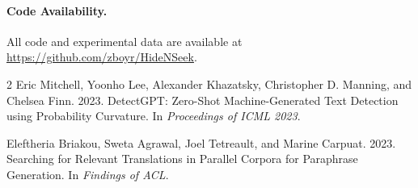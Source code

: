 \documentclass[sigconf,nonacm]{acmart}
\begin{document}
\paragraph{Code Availability.} All code and experimental data are available at \url{https://github.com/zboyr/HideNSeek}.


\begin{thebibliography}{2}
Eric Mitchell, Yoonho Lee, Alexander Khazatsky, Christopher D. Manning, and Chelsea Finn. 2023. DetectGPT: Zero-Shot Machine-Generated Text Detection using Probability Curvature. In \emph{Proceedings of ICML 2023}.

Eleftheria Briakou, Sweta Agrawal, Joel Tetreault, and Marine Carpuat. 2023. Searching for Relevant Translations in Parallel Corpora for Paraphrase Generation. In \emph{Findings of ACL}.
\end{thebibliography}
\end{document}
